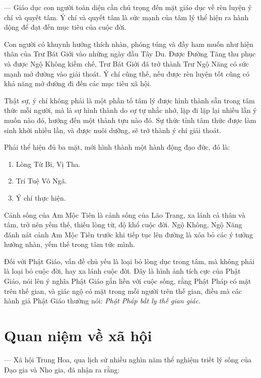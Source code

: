 — Giáo dục con người toàn diện cần chú trọng đến mặt giáo dục về rèn luyện ý chí và quyết tâm. Ý chí và quyết tâm là sức mạnh của tâm lý thể hiện ra hành dộng để đạt đến mục tiêu của cuộc đời.

Con người có khuynh hướng thích nhàn, phóng túng và đầy ham muốn như hiện thân của Trư Bát Giới vào những ngày đầu Tây Du. Được Đường Tăng thu phục và được Ngộ Không kiềm chế, Trư Bát Giới đã trở thành Trư Ngộ Năng có sức mạnh mở đường vào giải thoát. Ý chí cũng thế, nếu được rèn luyện tốt cũng có khả năng mở đường đi đến các mục tiêu xã hội.

Thật sự, ý chí không phải là một phần tố tâm lý được hình thành sẵn trong tâm thức mỗi người, mà là sự hình thành do sự tự nhắc nhở, lặp đi lặp lại nhiều lần ý muốn nào đó, hướng đến một thành tựu nào đó. Sự thức tỉnh tâm thức được làm sinh khởi nhiều lần, và được nuôi dưỡng, sẽ trở thành ý chí giải thoát.

Phải thể hiện đủ ba mặt, mới hình thành một hành động đạo đức, đó là:

\begin{enumerate}[label=\itshape\arabic*\upshape/]
    \item Lòng Từ Bi, Vị Tha.

    \item Trí Tuệ Vô Ngã.

    \item Ý chí thực hiện.
\end{enumerate}

Cảnh sống của Am Mộc Tiên là cảnh sống của Lão Trang, xa lánh cả thân và tâm, trở nên yếm thế, thiếu lòng từ, độ khổ cuộc đời. Ngộ Không, Ngộ Năng đánh nát cảnh Am Mộc Tiên trước khi tiếp tục lên đường là xóa bỏ các ý tưởng hưởng nhàn, yếm thế trong tâm tức mình.

Đối với Phật Giáo, vấn đề chủ yếu là loại bỏ lòng dục trong tâm, mà không phải là loại bỏ cuộc đời, hay xa lánh cuộc đời. Đây là hình ảnh tích cực của Phật Giáo, nói lên ý nghĩa Phật Giáo gắn liền với cuộc sống, rằng Phật Pháp có mặt trên thế gian, và giác ngộ có mặt trong mỗi người trên thế gian, điều mà các hành giả Phật Giáo thường nói: \emph{Phật Pháp bất ly thế gian giác}.

\section{Quan niệm về xã hội} %
\label{sec:64_xa_hoi}

— Xã hội Trung Hoa, qua lịch sử nhiều nghìn năm thể nghiệm triết lý sống của Đạo gia và Nho gia, đã nhận ra rằng:

